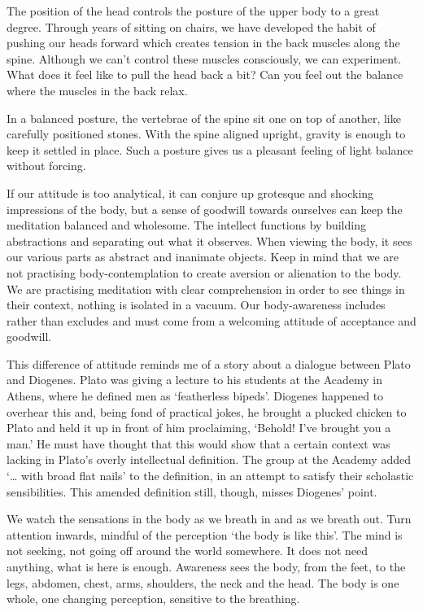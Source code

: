 The position of the head controls the posture of the upper body to a
great degree. Through years of sitting on chairs, we have developed the
habit of pushing our heads forward which creates tension in the back
muscles along the spine. Although we can't control these muscles
consciously, we can experiment. What does it feel like to pull the head
back a bit? Can you feel out the balance where the muscles in the back
relax.

In a balanced posture, the vertebrae of the spine sit one on top of
another, like carefully positioned stones. With the spine aligned
upright, gravity is enough to keep it settled in place. Such a posture
gives us a pleasant feeling of light balance without forcing.


If our attitude is too analytical, it can conjure up grotesque and
shocking impressions of the body, but a sense of goodwill towards
ourselves can keep the meditation balanced and wholesome. The intellect
functions by building abstractions and separating out what it observes.
When viewing the body, it sees our various parts as abstract and
inanimate objects. Keep in mind that we are not practising
body-contemplation to create aversion or alienation to the body. We are
practising meditation with clear comprehension in order to see things in
their context, nothing is isolated in a vacuum. Our body-awareness
includes rather than excludes and must come from a welcoming attitude of
acceptance and goodwill.

This difference of attitude reminds me of a story about a dialogue
between Plato and Diogenes. Plato was giving a lecture to his students
at the Academy in Athens, where he defined men as `featherless bipeds'.
Diogenes happened to overhear this and, being fond of practical jokes,
he brought a plucked chicken to Plato and held it up in front of him
proclaiming, `Behold! I've brought you a man.' He must have thought that
this would show that a certain context was lacking in Plato's overly
intellectual definition. The group at the Academy added `\ldots{} with
broad flat nails' to the definition, in an attempt to satisfy their
scholastic sensibilities. This amended definition still, though, misses
Diogenes' point.


We watch the sensations in the body as we breath in and as we breath
out. Turn attention inwards, mindful of the perception `the body is like
this'. The mind is not seeking, not going off around the world
somewhere. It does not need anything, what is here is enough. Awareness
sees the body, from the feet, to the legs, abdomen, chest, arms,
shoulders, the neck and the head. The body is one whole, one changing
perception, sensitive to the breathing.

